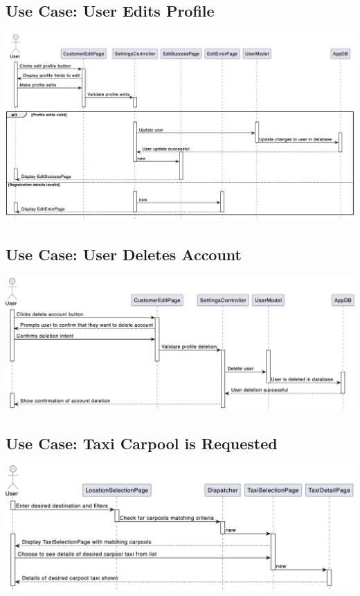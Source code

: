 \documentclass[]{article}
\begin{document}
\subsection*{Use Case: User Edits Profile}
\includegraphics[scale=0.45]{Sequence Diagrams/GS2.png}

\subsection*{Use Case: User Deletes Account}
\includegraphics[scale=0.45]{Sequence Diagrams/GS3.png}

\subsection*{Use Case: Taxi Carpool is Requested}
\includegraphics[scale=0.45]{Sequence Diagrams/GS4.png}
\end{document}
